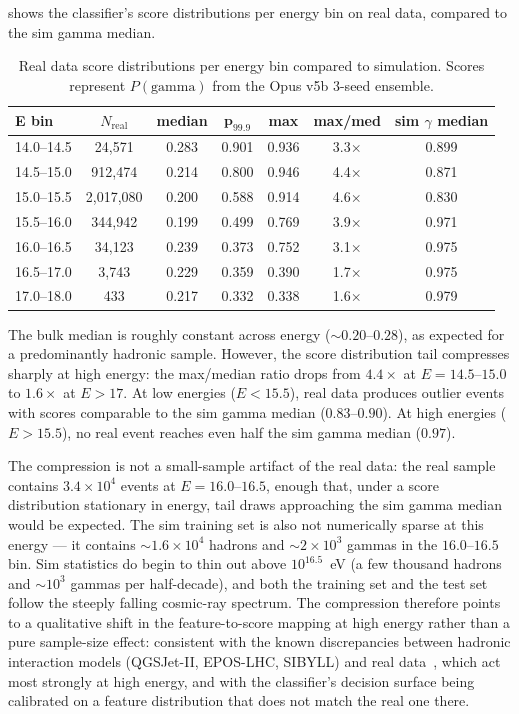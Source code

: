 \documentclass[universe,article,submit,pdftex,oneauthor]{Definitions/mdpi}
\begin{document}
 shows the classifier's score distributions per energy bin on real data, compared to the sim gamma median.

\begin{table}[H]
\caption{Real data score distributions per energy bin compared to simulation. Scores represent $P(\mathrm{gamma})$ from the Opus v5b 3-seed ensemble.\label{tab:real_scores}}
\begin{tabularx}{\textwidth}{lCCCCCC}
\toprule
\textbf{E bin} & $N_\mathrm{real}$ & \textbf{median} & $\mathbf{p_{99.9}}$ & \textbf{max} & \textbf{max/med} & \textbf{sim $\gamma$ median} \\
--14.5 & 24{,}571 & 0.283 & 0.901 & 0.936 & 3.3$\times$ & 0.899 \\
14.5--15.0 & 912{,}474 & 0.214 & 0.800 & 0.946 & 4.4$\times$ & 0.871 \\
15.0--15.5 & 2{,}017{,}080 & 0.200 & 0.588 & 0.914 & 4.6$\times$ & 0.830 \\
15.5--16.0 & 344{,}942 & 0.199 & 0.499 & 0.769 & 3.9$\times$ & 0.971 \\
16.0--16.5 & 34{,}123 & 0.239 & 0.373 & 0.752 & 3.1$\times$ & 0.975 \\
16.5--17.0 & 3{,}743 & 0.229 & 0.359 & 0.390 & 1.7$\times$ & 0.975 \\
17.0--18.0 & 433 & 0.217 & 0.332 & 0.338 & 1.6$\times$ & 0.979 \\
\bottomrule
\end{tabularx}
\end{table}

The bulk median is roughly constant across energy (${\sim}0.20$--$0.28$), as expected for a predominantly hadronic sample. However, the score distribution tail compresses sharply at high energy: the max/median ratio drops from $4.4\times$ at $E = 14.5$--$15.0$ to $1.6\times$ at $E > 17$. At low energies ($E < 15.5$), real data produces outlier events with scores comparable to the sim gamma median ($0.83$--$0.90$). At high energies ($E > 15.5$), no real event reaches even half the sim gamma median ($0.97$).

The compression is not a small-sample artifact of the real data: the real sample contains $3.4 \times 10^4$ events at $E = 16.0$--$16.5$, enough that, under a score distribution stationary in energy, tail draws approaching the sim gamma median would be expected. The sim training set is also not numerically sparse at this energy --- it contains ${\sim}1.6 \times 10^4$ hadrons and ${\sim}2 \times 10^3$ gammas in the $16.0$--$16.5$ bin. Sim statistics do begin to thin out above $10^{16.5}$~eV (a few thousand hadrons and ${\sim}10^3$ gammas per half-decade), and both the training set and the test set follow the steeply falling cosmic-ray spectrum. The compression therefore points to a qualitative shift in the feature-to-score mapping at high energy rather than a pure sample-size effect: consistent with the known discrepancies between hadronic interaction models (QGSJet-II, EPOS-LHC, SIBYLL) and real data~\cite{kcdc_sim_manual}, which act most strongly at high energy, and with the classifier's decision surface being calibrated on a feature distribution that does not match the real one there.
\end{document}
